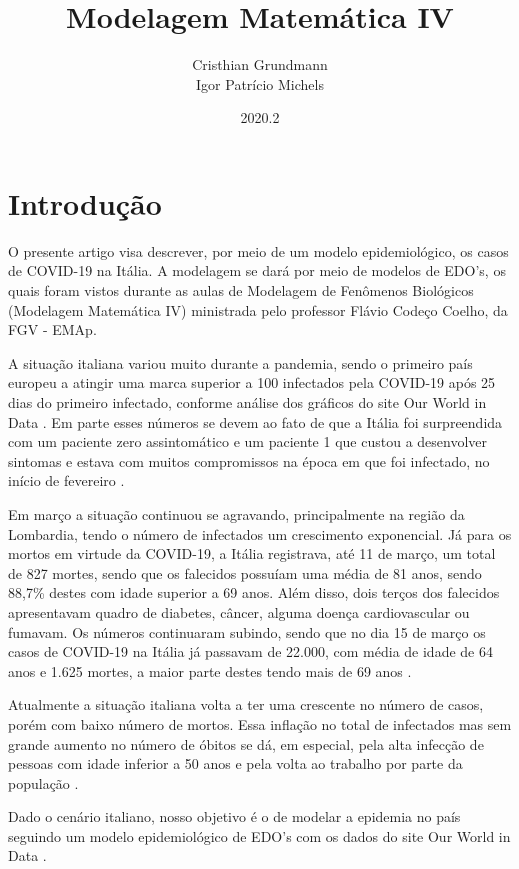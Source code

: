 \documentclass{article}
\title{Modelagem Matemática IV}
\author{Cristhian Grundmann \\
Igor Patrício Michels}
\date{2020.2}
\begin{document}
\maketitle

\section{Introdução}

O presente artigo visa descrever, por meio de um modelo epidemiológico, os casos de COVID-19 na Itália. A modelagem se dará por meio de modelos de EDO's, os quais foram vistos durante as aulas de Modelagem de Fenômenos Biológicos (Modelagem Matemática IV) ministrada pelo professor Flávio Codeço Coelho, da FGV - EMAp.

A situação italiana variou muito durante a pandemia, sendo o primeiro país europeu a atingir uma marca superior a 100 infectados pela COVID-19 após 25 dias do primeiro infectado, conforme análise dos gráficos do site Our World in Data \cite{owid}. Em parte esses números se devem ao fato de que a Itália foi surpreendida com um paciente zero assintomático e um paciente 1 que custou a desenvolver sintomas e estava com muitos compromissos na época em que foi infectado, no início de fevereiro \cite{dn}\cite{cm}.

Em março a situação continuou se agravando, principalmente na região da Lombardia, tendo o número de infectados um crescimento exponencial. Já para os mortos em virtude da COVID-19, a Itália registrava, até 11 de março, um total de 827 mortes, sendo que os falecidos possuíam uma média de 81 anos, sendo 88,7\% destes com idade superior a 69 anos. Além disso, dois terços dos falecidos apresentavam quadro de diabetes, câncer, alguma doença cardiovascular ou fumavam. Os números continuaram subindo, sendo que no dia 15 de março os casos de COVID-19 na Itália já passavam de 22.000, com média de idade de 64 anos e 1.625 mortes, a maior parte destes tendo mais de 69 anos \cite{REMUZZI20201225}\cite{10.1001/jama.2020.4344}.

Atualmente a situação italiana volta a ter uma crescente no número de casos, porém com baixo número de mortos. Essa inflação no total de infectados mas sem grande aumento no número de óbitos se dá, em especial, pela alta infecção de pessoas com idade inferior a 50 anos \cite{istoe} e pela volta ao trabalho por parte da população \cite{folha}.

Dado o cenário italiano, nosso objetivo é o de modelar a epidemia no país seguindo um modelo epidemiológico de EDO's com os dados do site Our World in Data \cite{owid}.
\end{document}
